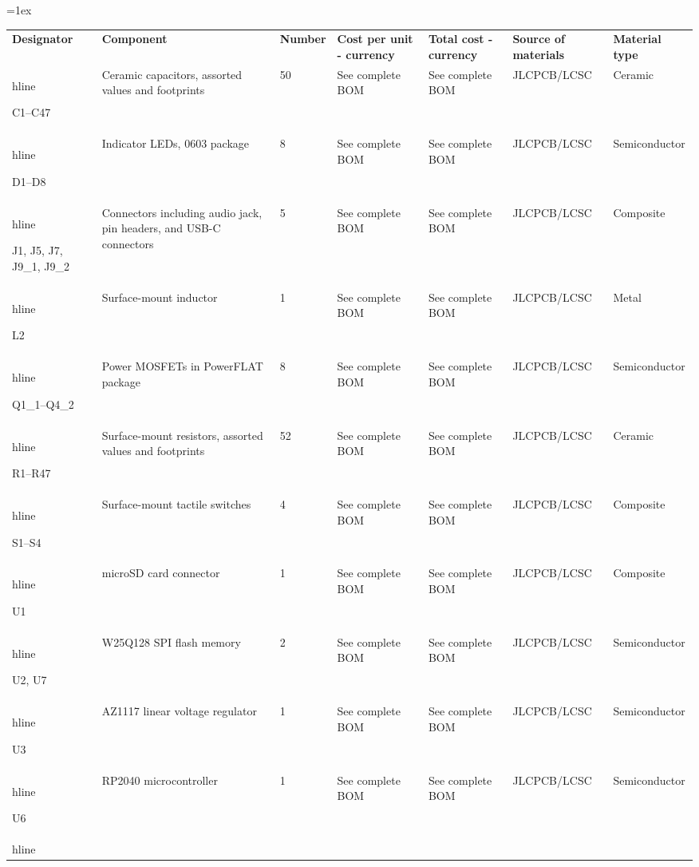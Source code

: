 \vskip 0.2cm
\tabulinesep=1ex
\noindent
\begin{tabu} to \linewidth {|X[1.1,1]|X|X[0.6,1]|X[0.8,1]|X|X|X[1.1,1]|}
\hline
\textbf{Designator} & \textbf{Component} & \textbf{Number} & \textbf{Cost per unit - currency} & \textbf{Total cost - currency} & \textbf{Source of materials} & \textbf{Material type} \\hline

C1--C47 & Ceramic capacitors, assorted values and footprints & 50 & See complete BOM & See complete BOM & JLCPCB/LCSC & Ceramic \\hline

D1--D8 & Indicator LEDs, 0603 package & 8 & See complete BOM & See complete BOM & JLCPCB/LCSC & Semiconductor \\hline

J1, J5, J7, J9_1, J9_2 & Connectors including audio jack, pin headers, and USB-C connectors & 5 & See complete BOM & See complete BOM & JLCPCB/LCSC & Composite \\hline

L2 & Surface-mount inductor & 1 & See complete BOM & See complete BOM & JLCPCB/LCSC & Metal \\hline

Q1_1--Q4_2 & Power MOSFETs in PowerFLAT package & 8 & See complete BOM & See complete BOM & JLCPCB/LCSC & Semiconductor \\hline

R1--R47 & Surface-mount resistors, assorted values and footprints & 52 & See complete BOM & See complete BOM & JLCPCB/LCSC & Ceramic \\hline

S1--S4 & Surface-mount tactile switches & 4 & See complete BOM & See complete BOM & JLCPCB/LCSC & Composite \\hline

U1 & microSD card connector & 1 & See complete BOM & See complete BOM & JLCPCB/LCSC & Composite \\hline

U2, U7 & W25Q128 SPI flash memory & 2 & See complete BOM & See complete BOM & JLCPCB/LCSC & Semiconductor \\hline

U3 & AZ1117 linear voltage regulator & 1 & See complete BOM & See complete BOM & JLCPCB/LCSC & Semiconductor \\hline

U6 & RP2040 microcontroller & 1 & See complete BOM & See complete BOM & JLCPCB/LCSC & Semiconductor \\hline


\end{tabu}

